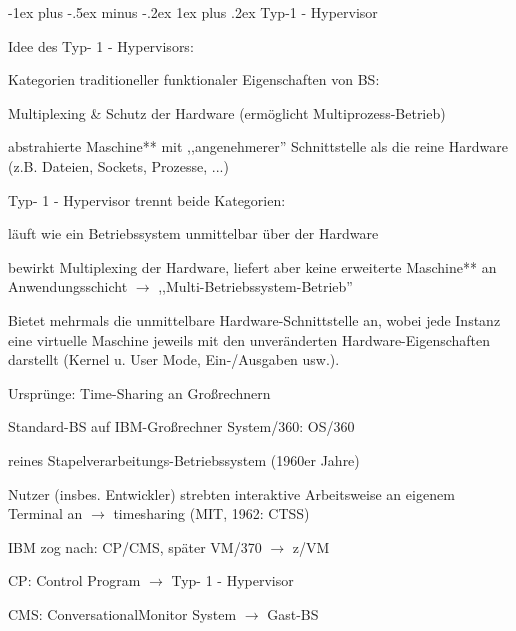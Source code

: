 \documentclass[a4paper]{article}
\makeatletter
\renewcommand{\subsubsection}{\@startsection{subsubsection}{3}{0mm}%
 {-1ex plus -.5ex minus -.2ex}%
 {1ex plus .2ex}%
 {\normalfont\small\bfseries}}
\makeatother
\begin{document}
\begin{multicols}{3}
    \subsubsection{Typ-1 - Hypervisor}

    \begin{itemize*}
        \item
        Idee des Typ- 1 - Hypervisors:
        \begin{itemize*}
            \item Kategorien traditioneller funktionaler Eigenschaften von BS: \begin{enumerate*} \item Multiplexing \& Schutz der Hardware (ermöglicht Multiprozess-Betrieb) \item abstrahierte Maschine** mit ,,angenehmerer'' Schnittstelle als die reine Hardware (z.B. Dateien, Sockets, Prozesse, ...) \end{enumerate*}
        \end{itemize*}
        \item
        Typ- 1 - Hypervisor trennt beide Kategorien:
        \begin{itemize*}
            \item läuft wie ein Betriebssystem unmittelbar über der Hardware
            \item bewirkt Multiplexing der Hardware, liefert aber keine erweiterte Maschine** an Anwendungsschicht $\rightarrow$ ,,Multi-Betriebssystem-Betrieb''
        \end{itemize*}
        \item
        Bietet mehrmals die unmittelbare Hardware-Schnittstelle an, wobei jede
        Instanz eine virtuelle Maschine jeweils mit den unveränderten
        Hardware-Eigenschaften darstellt (Kernel u. User Mode, Ein-/Ausgaben
        usw.).
        \item
        Ursprünge: Time-Sharing an Großrechnern
        \begin{itemize*}
            \item Standard-BS auf IBM-Großrechner System/360: OS/360
            \item reines Stapelverarbeitungs-Betriebssystem (1960er Jahre)
            \item Nutzer (insbes. Entwickler) strebten interaktive Arbeitsweise an eigenem Terminal an $\rightarrow$ timesharing (MIT, 1962: CTSS) \begin{itemize*} \item IBM zog nach: CP/CMS, später VM/370 $\rightarrow$ z/VM \item CP: Control Program $\rightarrow$ Typ- 1 - Hypervisor \item CMS: ConversationalMonitor System $\rightarrow$ Gast-BS \end{itemize*}

\end{itemize*}
\end{itemize*}
\end{multicols}
\end{document}
